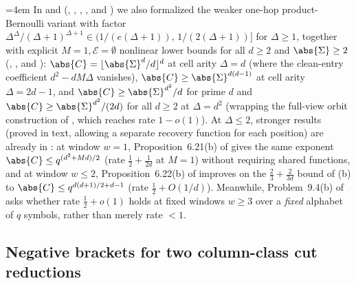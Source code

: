 \begin{remark}\label{rem:capacity-context}
{\emergencystretch=4em
In  and 
(, ,
, , and
) we also formalized the weaker one-hop product-Bernoulli
variant with factor $\Delta^\Delta/(\Delta+1)^{\Delta+1} \in \bigl(1/(e(\Delta+1)),\,
1/(2(\Delta+1))\bigr]$ for $\Delta \ge 1$, together with explicit $M = 1, \mathcal{E} = \emptyset$ nonlinear lower bounds
for all $d \ge 2$ and $\abs{\Sigma} \ge 2$ (,
, and
):
$\abs{C} = \lfloor\abs{\Sigma}^d / d\rfloor^d$ at cell arity $\Delta = d$ (where the clean-entry
coefficient $d^2 - dM\Delta$ vanishes), $\abs{C} \ge \abs{\Sigma}^{d(d-1)}$ at cell arity
$\Delta = 2d - 1$, and $\abs{C} \ge \abs{\Sigma}^{d^2}/d$ for prime $d$ and
$\abs{C} \ge \abs{\Sigma}^{d^2}/(2d)$ for all $d \ge 2$ at $\Delta = d^2$ (wrapping the full-view
orbit construction of \cite[Theorem~A.1 and Corollary~A.2]{SharedDecoders2026}, which reaches rate
$1 - o(1)$). At $\Delta \le 2$, stronger results (proved
in text, allowing a separate recovery function for each position) are already in
\cite{SeventeenthPaper2026}: at window $w = 1$, Proposition~6.21(b) of \cite{SeventeenthPaper2026}
gives the same exponent $\abs{C} \le q^{(d^2 + Md)/2}$ (rate $\frac{1}{2} + \frac{1}{2d}$ at
$M = 1$) without requiring shared functions, and at window $w \le 2$,
Proposition~6.22(b) of \cite{SeventeenthPaper2026} improves on the $\frac{2}{3} + \frac{2}{3d}$ bound
of (b) to $\abs{C} \le q^{d(d+1)/2 + d - 1}$ (rate
$\frac{1}{2} + O(1/d)$).
Meanwhile, Problem~9.4(b) of \cite{SeventeenthPaper2026} asks whether rate $\frac{1}{2} + o(1)$ holds
at fixed windows $w \ge 3$ over a \emph{fixed} alphabet of $q$ symbols, rather than merely rate
$< 1$.\par}
\end{remark}

\subsection{Negative brackets for two column-class cut reductions}\label{sec:sweep-remark}

